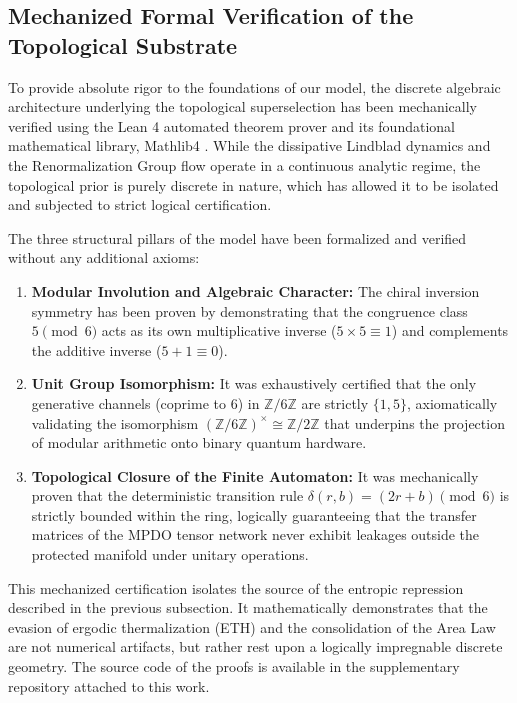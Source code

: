 \documentclass[12pt,a4paper]{article}
\theoremstyle{plain}
\theoremstyle{definition}
\theoremstyle{remark}
\begin{document}
\subsection{Mechanized Formal Verification of the Topological Substrate}
\label{subsec:verificacion_formal}

To provide absolute rigor to the foundations of our model, the discrete algebraic architecture underlying the topological superselection has been mechanically verified using the Lean 4 automated theorem prover and its foundational mathematical library, Mathlib4 \cite{moura2021lean4, mathlib2020}. While the dissipative Lindblad dynamics and the Renormalization Group flow operate in a continuous analytic regime, the topological prior is purely discrete in nature, which has allowed it to be isolated and subjected to strict logical certification.

The three structural pillars of the model have been formalized and verified without any additional axioms:
\begin{enumerate}
    \item \textbf{Modular Involution and Algebraic Character:} The chiral inversion symmetry has been proven by demonstrating that the congruence class $5 \pmod 6$ acts as its own multiplicative inverse ($5 \times 5 \equiv 1$) and complements the additive inverse ($5 + 1 \equiv 0$).
    \item \textbf{Unit Group Isomorphism:} It was exhaustively certified that the only generative channels (coprime to 6) in $\mathbb{Z}/6\mathbb{Z}$ are strictly $\{1, 5\}$, axiomatically validating the isomorphism $(\mathbb{Z}/6\mathbb{Z})^{\times} \cong \mathbb{Z}/2\mathbb{Z}$ that underpins the projection of modular arithmetic onto binary quantum hardware.
    \item \textbf{Topological Closure of the Finite Automaton:} It was mechanically proven that the deterministic transition rule $\delta(r,b) = (2r+b) \pmod 6$ is strictly bounded within the ring, logically guaranteeing that the transfer matrices of the MPDO tensor network never exhibit leakages outside the protected manifold under unitary operations.
\end{enumerate}

This mechanized certification isolates the source of the entropic repression described in the previous subsection. It mathematically demonstrates that the evasion of ergodic thermalization (ETH) and the consolidation of the Area Law are not numerical artifacts, but rather rest upon a logically impregnable discrete geometry. The source code of the proofs is available in the supplementary repository attached to this work.
\end{document}
